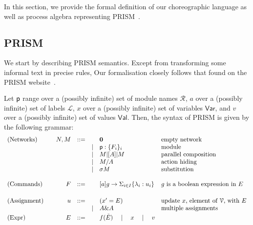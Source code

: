 In this section, we provide the formal definition of our choreographic
language as well as process algebra representing
PRISM~\cite{prismsemantics}.


\subsection{PRISM} We start by describing PRISM semantics. Except from
transforming some informal text in precise rules, Our formalisation
closely follows that found on the PRISM website~\cite{prismemantics}.

\smallskip

 Let $\textsf{p}$ range over a (possibly infinite) set of
module names $\mathcal R$, $a$ over a (possibly infinite) set of
labels $\mathcal L$, $x$ over a (possibly infinite) set of variables
$\mathsf{Var}$, and $v$ over a (possibly infinite) set of values
$\mathsf{Val}$. Then, the syntax of PRISM is given by the following
grammar:
\begin{displaymath}
  \begin{array}{lrllll}
    \text{(Networks)}  \quad
    & N, M  & ::=  &      & \mathbf{0} & \text{empty network}\\
    &       &      & \mid & \textsf{p}:\{F_i\}_i & \text{module}\\
    &       &      & \mid & M |[A]| M & \text{parallel composition}\\
    &       &      & \mid & M/A        & \text{action hiding}\\
    &       &      & \mid & \sigma M   & \text{substitution}\\
    \\
    \text{(Commands)}  \quad
    & F     & ::=  &      & [a] g \rightarrow \Sigma_{i\in I}\{\lambda_i: u_i\}
                                  & \text{$g$ is a boolean expression in $E$} \\
    \\[1mm]
    \text{(Assignment)} \quad
    & u     & ::=  &      & (x' = E) & \text{update $x$, element of $\mathcal V$, with $E$}\\
    &       &      & \mid & A \& A   & \text{multiple assignments}
    \\[1mm]
    \text{(Expr)}\quad
    & E     & ::= &       & f(\tilde E)\quad\mid\quad x\quad\mid\quad v
  \end{array}
\end{displaymath}
